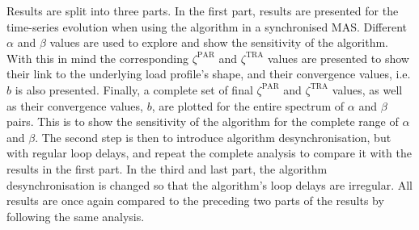 Results are split into three parts.
In the first part, results are presented for the time-series evolution when using the algorithm in a synchronised MAS.
Different $\alpha$ and $\beta$ values are used to explore and show the sensitivity of the algorithm.
With this in mind the corresponding $\zeta^\text{PAR}$ and $\zeta^\text{TRA}$ values are presented to show their link to the underlying load profile's shape, and their convergence values, i.e. $b$ is also presented.
Finally, a complete set of final $\zeta^\text{PAR}$ and $\zeta^\text{TRA}$ values, as well as their convergence values, $b$, are plotted for the entire spectrum of $\alpha$ and $\beta$ pairs.
This is to show the sensitivity of the algorithm for the complete range of $\alpha$ and $\beta$.
The second step is then to introduce algorithm desynchronisation, but with regular loop delays, and repeat the complete analysis to compare it with the results in the first part.
In the third and last part, the algorithm desynchronisation is changed so that the algorithm's loop delays are irregular.
All results are once again compared to the preceding two parts of the results by following the same analysis.




